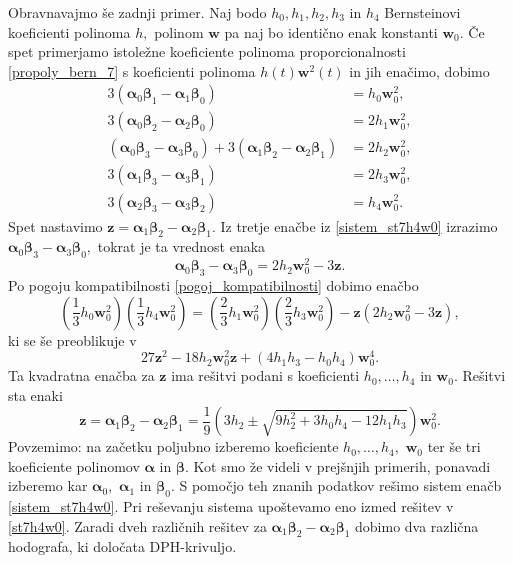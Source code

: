 \documentclass[12pt,a4paper,twoside]{article}
\theoremstyle{definition} %
\theoremstyle{plain} %
\theoremstyle{primerstyle}
\numberwithin{equation}{section}  %
\newcommand{\wV}{\mathbf{w}}
\newcommand{\zV}{\mathbf{z}}
\newcommand{\balpha}{\boldsymbol \alpha}
\newcommand{\bbeta}{\boldsymbol \beta}
\begin{document}
Obravnavajmo še zadnji primer. Naj bodo $h_0,h_1,h_2,h_3$ in $h_4$ Bernsteinovi koeficienti polinoma $h,$ polinom $\wV$ pa naj bo identično enak konstanti $\wV_0.$ Če spet primerjamo istoležne koeficiente polinoma proporcionalnosti \eqref{propoly_bern_7} s koeficienti polinoma $h(t)\wV^2(t)$ in jih enačimo, dobimo
\begin{align}
	3(\balpha_0\bbeta_1-\balpha_1\bbeta_0)&=h_0\wV_0^2,\nonumber\\
	3(\balpha_0\bbeta_2-\balpha_2\bbeta_0)&=2h_1\wV_0^2,\nonumber\\
	(\balpha_0\bbeta_3-\balpha_3\bbeta_0)+3(\balpha_1\bbeta_2-\balpha_2\bbeta_1)&=2h_2\wV_0^2,\label{sistem_st7h4w0}\\
	3(\balpha_1\bbeta_3-\balpha_3\bbeta_1)&=2h_3\wV_0^2,\nonumber\\
	3(\balpha_2\bbeta_3-\balpha_3\bbeta_2)&=h_4\wV_0^2.\nonumber
\end{align}
Spet nastavimo $\zV=\balpha_1\bbeta_2-\balpha_2\bbeta_1.$ Iz tretje enačbe iz \eqref{sistem_st7h4w0} izrazimo $\balpha_0\bbeta_3-\balpha_3\bbeta_0,$ tokrat je ta vrednost enaka $$\balpha_0\bbeta_3-\balpha_3\bbeta_0=2h_2\wV_0^2-3\zV.$$ Po pogoju kompatibilnosti \eqref{pogoj_kompatibilnosti} dobimo enačbo
\begin{equation*}
	\left(\frac{1}{3}h_0\wV_0^2\right)\left(\frac{1}{3}h_4\wV_0^2\right)=\left(\frac{2}{3}h_1\wV_0^2\right)\left(\frac{2}{3}h_3\wV_0^2\right)-\zV(2h_2\wV_0^2-3\zV),
\end{equation*}
ki se še preoblikuje v
\begin{equation*}
	27\zV^2-18h_2\wV_0^2\zV+(4h_1h_3-h_0h_4)\wV_0^4.
\end{equation*}
Ta kvadratna enačba za $\zV$ ima rešitvi podani s koeficienti $h_0,\dots,h_4$ in $\wV_0.$ Rešitvi sta enaki
\begin{equation}
	\label{st7h4w0}
	\zV=\balpha_1\bbeta_2-\balpha_2\bbeta_1=\frac{1}{9}\left(3h_2\pm\sqrt{9h_2^2+3h_0h_4-12h_1h_3}\right)\wV_0^2.
\end{equation}
Povzemimo: na začetku poljubno izberemo koeficiente $h_0,\dots,h_4,$ $\wV_0$ ter še tri koeficiente polinomov $\balpha$ in $\bbeta.$ Kot smo že videli v prejšnjih primerih, ponavadi izberemo kar $\balpha_0,$ $\balpha_1$ in $\bbeta_0.$ S pomočjo teh znanih podatkov rešimo sistem enačb \eqref{sistem_st7h4w0}. Pri reševanju sistema upoštevamo eno izmed rešitev v \eqref{st7h4w0}. Zaradi dveh različnih rešitev za $\balpha_1\bbeta_2-\balpha_2\bbeta_1$ dobimo dva različna hodografa, ki določata DPH-krivuljo.
\clearpage
\end{document}
